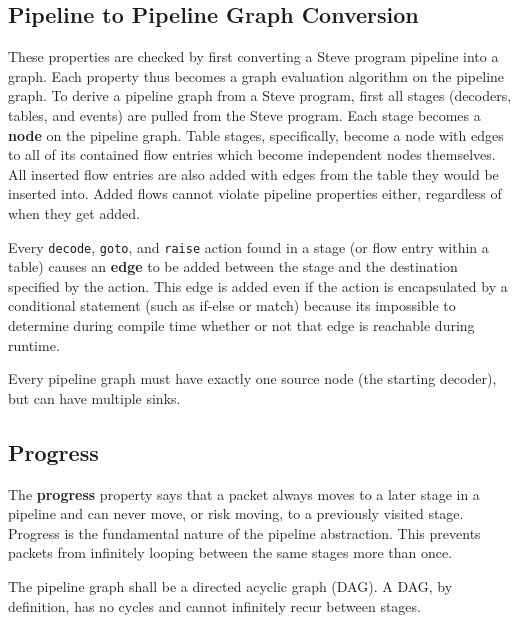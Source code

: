 \subsection{Pipeline to Pipeline Graph Conversion} \label{guide:pipeline_graph}

These properties are checked by first converting a Steve program pipeline into a graph. Each property thus becomes a graph evaluation algorithm on the pipeline graph. To derive a pipeline graph from a Steve program, first all stages (decoders, tables, and events) are pulled from the Steve program. Each stage becomes a \textbf{node} on the pipeline graph. Table stages, specifically, become a node with edges to all of its contained flow entries which become independent nodes themselves. All inserted flow entries are also added with edges from the table they would be inserted into. Added flows cannot violate pipeline properties either, regardless of when they get added.

Every \texttt{decode}, \texttt{goto}, and \texttt{raise} action found in a stage (or flow entry within a table) causes an \textbf{edge} to be added between the stage and the destination specified by the action. This edge is added even if the action is encapsulated by a conditional statement (such as if-else or match) because its impossible to determine during compile time whether or not that edge is reachable during runtime.

Every pipeline graph must have exactly one source node (the starting decoder), but can have multiple sinks.

\subsection{Progress} \label{guide:progress}

The \textbf{progress} property says that a packet always moves to a later stage in a pipeline and can never move, or risk moving, to a previously visited stage. Progress is the fundamental nature of the pipeline abstraction. This prevents packets from infinitely looping between the same stages more than once.

The pipeline graph shall be a directed acyclic graph (DAG). A DAG, by definition, has no cycles and cannot infinitely recur between stages.

